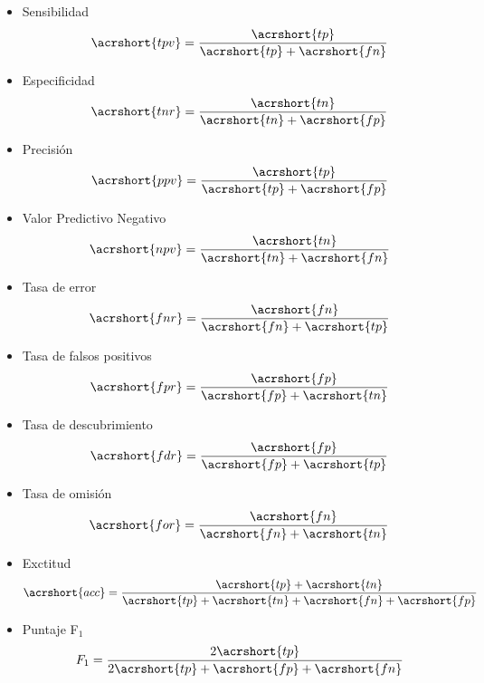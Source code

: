 \begin{itemize}
  \item Sensibilidad
  \begin{align}
    \acrshort{tpv} = \frac{\acrshort{tp}}{\acrshort{tp}+\acrshort{fn}}
  \end{align}

  \item Especificidad
  \begin{align}
    \acrshort{tnr} = \frac{\acrshort{tn}}{\acrshort{tn}+\acrshort{fp}}
  \end{align}

  \item Precisión
  \begin{align}
    \acrshort{ppv} = \frac{\acrshort{tp}}{\acrshort{tp}+\acrshort{fp}}
  \end{align}

  \item Valor Predictivo Negativo
  \begin{align}
    \acrshort{npv} = \frac{\acrshort{tn}}{\acrshort{tn}+\acrshort{fn}}
  \end{align}

  \item Tasa de error
  \begin{align}
    \acrshort{fnr} = \frac{\acrshort{fn}}{\acrshort{fn}+\acrshort{tp}}
  \end{align}

  \item Tasa de falsos positivos
  \begin{align}
    \acrshort{fpr} = \frac{\acrshort{fp}}{\acrshort{fp}+\acrshort{tn}}
  \end{align}

  \item Tasa de descubrimiento
  \begin{align}
    \acrshort{fdr} = \frac{\acrshort{fp}}{\acrshort{fp}+\acrshort{tp}}
  \end{align}

  \item Tasa de omisión
  \begin{align}
    \acrshort{for} = \frac{\acrshort{fn}}{\acrshort{fn}+\acrshort{tn}}
  \end{align}

  \item Exctitud
  \begin{align}
    \acrshort{acc} = \frac{\acrshort{tp}+\acrshort{tn}}{\acrshort{tp}+\acrshort{tn}+\acrshort{fn}+\acrshort{fp}}
  \end{align}

  \item Puntaje F$_1$
  \begin{align}
    F_1 = \frac{2\acrshort{tp}}{2\acrshort{tp}+\acrshort{fp}+\acrshort{fn}}
  \end{align}
\end{itemize}

